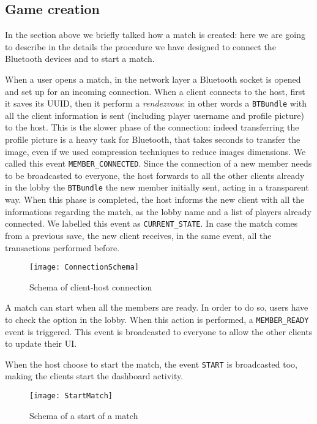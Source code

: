 \subsection{Game creation}

In the section above we briefly talked how a match is created: here we are 
going to describe in the details the procedure we have designed to connect the 
Bluetooth devices and to start a match.

When a user opens a match, in the network layer a Bluetooth socket is opened 
and set up for an incoming connection. When a client connects to the host, first 
it saves its UUID, then it perform a \textit{rendezvous}: in other words a 
\texttt{BTBundle} with all the client information is sent (including player 
username and profile picture) to the host. This is the slower phase of the 
connection: indeed transferring the profile picture is a heavy task for 
Bluetooth, that takes seconds to transfer the image, even if we used compression 
techniques to reduce images dimensions. We called this event 
\texttt{MEMBER\_CONNECTED}. Since the connection of a new member needs to be 
broadcasted to everyone, the host forwards to all the other clients already in 
the lobby the \texttt{BTBundle} the new member initially sent, acting in a 
transparent way. When this phase is completed, the host informs the new client 
with all the informations regarding the match, as the lobby name and a list of 
players already connected. We labelled this event as \texttt{CURRENT\_STATE}. In 
case the match comes from a previous save, the new client receives, in the same 
event, all the transactions performed before.

\begin{figure}[t]
 \centering
 \texttt{[image: ConnectionSchema]}
 \caption{Schema of client-host connection}
 \label{fig:gbConnectionSchema}
\end{figure}

A match can start when all the members are ready. In order to do so, users have 
to check the option in the lobby. When this action is performed, a 
\texttt{MEMBER\_READY} event is triggered. This event is broadcasted to everyone 
to allow the other clients to update their UI.

When the host choose to start the match, the event \texttt{START} is 
broadcasted too, making the clients start the dashboard activity.

\begin{figure}[t]
 \centering
 \texttt{[image: StartMatch]}
 \caption{Schema of a start of a match}
 \label{fig:gbStartMatch}
\end{figure}

